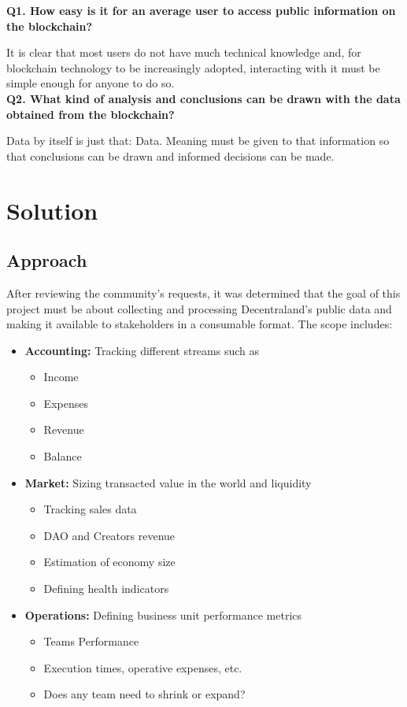 \documentclass[MSE,Master,english]{twbook}%
\begin{document}
\textbf{Q1. How easy is it for an average user to access public information on the blockchain?}

It is clear that most users do not have much technical knowledge and, for blockchain technology to be increasingly adopted, interacting with it must be simple enough for anyone to do so. \\

\textbf{Q2. What kind of analysis and conclusions can be drawn with the data obtained from the blockchain?}

Data by itself is just that: Data. Meaning must be given to that information so that conclusions can be drawn and informed decisions can be made.
\pagebreak
\chapter{Solution\label{solution}}
\section{Approach\label{approach}}
After reviewing the community's requests, it was determined that the goal of this project must be about collecting and processing Decentraland's public data and making it available to stakeholders in a consumable format. The scope includes:

\begin{itemize}
  \item \textbf{Accounting:} Tracking different streams such as
  \begin{itemize}
    \item Income
    \item Expenses
    \item Revenue
    \item Balance
  \end{itemize}
  \item \textbf{Market:} Sizing transacted value in the world and liquidity
  \begin{itemize}
    \item Tracking sales data
    \item \gls{DAO} and Creators revenue
    \item Estimation of economy size
    \item Defining health indicators
  \end{itemize}
  \item \textbf{Operations:} Defining business unit performance metrics
  \begin{itemize}
    \item Teams Performance
    \item Execution times, operative expenses, etc.
    \item Does any team need to shrink or expand?
  \end{itemize}
\end{itemize}
\end{document}
